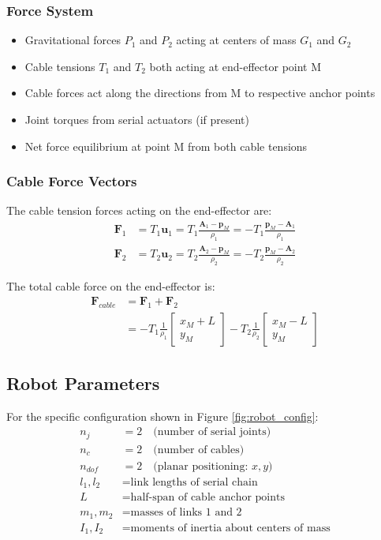 \documentclass[11pt,a4paper]{article}
\begin{document}
\subsubsection{Force System}  
\begin{itemize}
    \item Gravitational forces $P_1$ and $P_2$ acting at centers of mass $G_1$ and $G_2$
    \item Cable tensions $T_1$ and $T_2$ both acting at end-effector point M
    \item Cable forces act along the directions from M to respective anchor points
    \item Joint torques from serial actuators (if present)
    \item Net force equilibrium at point M from both cable tensions
\end{itemize}

\subsubsection{Cable Force Vectors}
The cable tension forces acting on the end-effector are:
\begin{align}
\bm{F}_1 &= T_1 \bm{u}_1 = T_1 \frac{\bm{A}_1 - \bm{p}_M}{\rho_1} = -T_1 \frac{\bm{p}_M - \bm{A}_1}{\rho_1} \\
\bm{F}_2 &= T_2 \bm{u}_2 = T_2 \frac{\bm{A}_2 - \bm{p}_M}{\rho_2} = -T_2 \frac{\bm{p}_M - \bm{A}_2}{\rho_2}
\end{align}

The total cable force on the end-effector is:
\begin{align}
\bm{F}_{cable} &= \bm{F}_1 + \bm{F}_2 \\
&= -T_1 \frac{1}{\rho_1}\begin{bmatrix} x_M + L \\ y_M \end{bmatrix} - T_2 \frac{1}{\rho_2}\begin{bmatrix} x_M - L \\ y_M \end{bmatrix}
\end{align}

\subsection{Robot Parameters}
For the specific configuration shown in Figure \ref{fig:robot_config}:
\begin{align}
n_j &= 2 \quad \text{(number of serial joints)} \\
n_c &= 2 \quad \text{(number of cables)} \\
n_{dof} &= 2 \quad \text{(planar positioning: } x, y \text{)} \\
l_1, l_2 &= \text{link lengths of serial chain} \\
L &= \text{half-span of cable anchor points} \\
m_1, m_2 &= \text{masses of links 1 and 2} \\
I_1, I_2 &= \text{moments of inertia about centers of mass}
\end{align}
\end{document}
